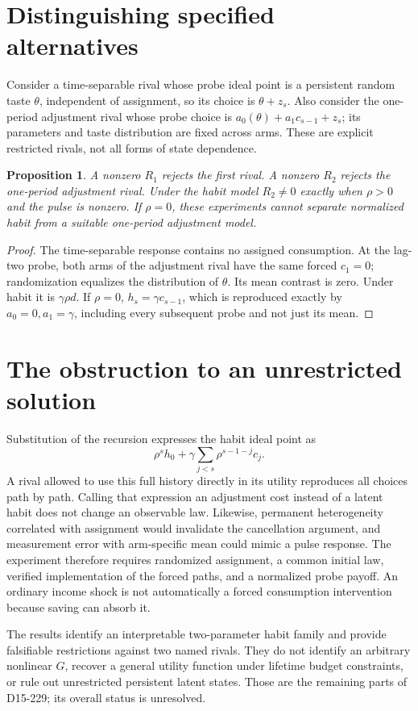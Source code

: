 \documentclass[11pt]{article}
\newtheorem{proposition}[theorem]{Proposition}
\theoremstyle{definition}
\begin{document}
\section*{Distinguishing specified alternatives}
Consider a time-separable rival whose probe ideal point is a persistent
random taste $\theta$, independent of assignment, so its choice is
$\theta+z_s$. Also consider the one-period adjustment rival whose probe
choice is $a_0(\theta)+a_1c_{s-1}+z_s$; its parameters and taste distribution
are fixed across arms. These are explicit restricted rivals, not all forms
of state dependence.
\begin{proposition}
A nonzero $R_1$ rejects the first rival. A nonzero $R_2$ rejects the
one-period adjustment rival. Under the habit model $R_2\ne0$ exactly when
$\rho>0$ and the pulse is nonzero. If $\rho=0$, these experiments cannot
separate normalized habit from a suitable one-period adjustment model.
\end{proposition}
\begin{proof}
The time-separable response contains no assigned consumption. At the lag-two
probe, both arms of the adjustment rival have the same forced $c_1=0$;
randomization equalizes the distribution of $\theta$. Its mean contrast is
zero. Under habit it is $\gamma\rho d$. If $\rho=0$, $h_s=\gamma c_{s-1}$,
which is reproduced exactly by $a_0=0,a_1=\gamma$, including every subsequent
probe and not just its mean.
\end{proof}

\section*{The obstruction to an unrestricted solution}
Substitution of the recursion expresses the habit ideal point as
\[
 \rho^s h_0+\gamma\sum_{j<s}\rho^{s-1-j}c_j.
\]
A rival allowed to use this full history directly in its utility reproduces
all choices path by path. Calling that expression an adjustment cost instead
of a latent habit does not change an observable law. Likewise, permanent
heterogeneity correlated with assignment would invalidate the cancellation
argument, and measurement error with arm-specific mean could mimic a pulse
response. The experiment therefore requires randomized assignment, a common
initial law, verified implementation of the forced paths, and a normalized
probe payoff. An ordinary income shock is not automatically a forced
consumption intervention because saving can absorb it.

The results identify an interpretable two-parameter habit family and provide
falsifiable restrictions against two named rivals. They do not identify an
arbitrary nonlinear $G$, recover a general utility function under lifetime
budget constraints, or rule out unrestricted persistent latent states. Those
are the remaining parts of D15-229; its overall status is unresolved.
\end{document}
